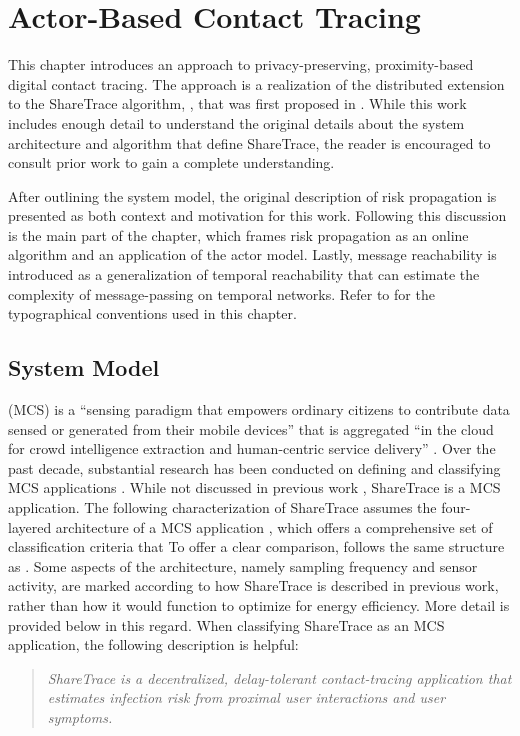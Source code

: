 \chapter{Actor-Based Contact Tracing}

This chapter introduces an approach to privacy-preserving, proximity-based digital contact tracing. The approach is a realization of the distributed extension to the ShareTrace algorithm, , that was first proposed in \cite{Ayday2021}. While this work includes enough detail to understand the original details about the system architecture and algorithm that define ShareTrace, the reader is encouraged to consult prior work \cite{Ayday2020, Ayday2021} to gain a complete understanding.

After outlining the system model, the original description of risk propagation is presented as both context and motivation for this work. Following this discussion is the main part of the chapter, which frames risk propagation as an online algorithm and an application of the actor model. Lastly, message reachability is introduced as a generalization of temporal reachability that can estimate the complexity of message-passing on temporal networks. Refer to  for the typographical conventions used in this chapter.

\section{System Model}

 (MCS) is a ``sensing paradigm that empowers ordinary citizens to contribute data sensed or generated from their mobile devices'' that is aggregated  ``in the cloud for crowd intelligence extraction and human-centric service delivery'' \cite{Guo2015}. Over the past decade, substantial research has been conducted on defining and classifying MCS applications \cite[and references therein]{Capponi2019, Guo2015}. While not discussed in previous work \cite{Ayday2020, Ayday2021}, ShareTrace is a MCS application. The following characterization of ShareTrace assumes the four-layered architecture of a MCS application \cite{Capponi2019}, which offers a comprehensive set of classification criteria that To offer a clear comparison,  follows the same structure as \cite{Capponi2019}. Some aspects of the architecture, namely sampling frequency and sensor activity, are marked according to how ShareTrace is described in previous work, rather than how it would function to optimize for energy efficiency. More detail is provided below in this regard. When classifying ShareTrace as an MCS application, the following description is helpful:
%
\begin{quote}
	\emph{ShareTrace is a decentralized, delay-tolerant contact-tracing application that estimates infection risk from proximal user interactions and user symptoms.}
\end{quote}

